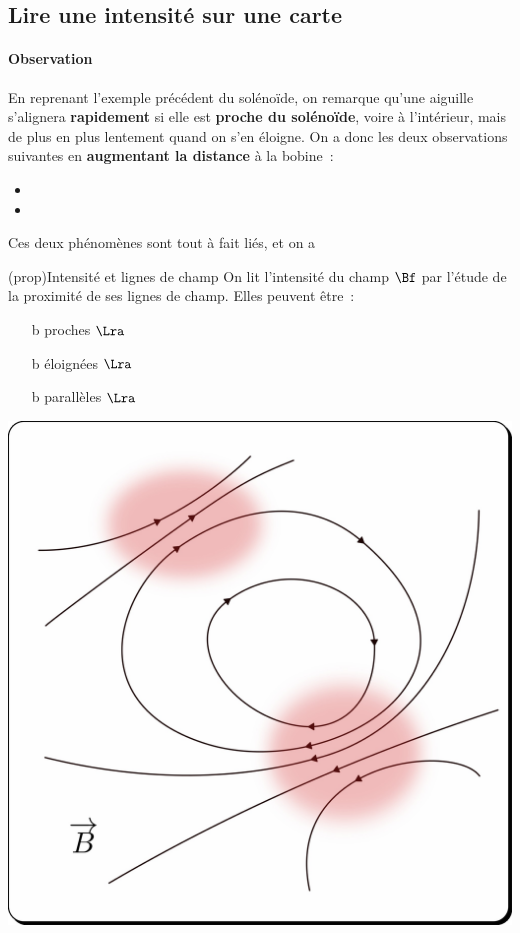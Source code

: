 \documentclass[../../main/main.tex]{subfiles}
\begin{document}
\subsection{Lire une intensité sur une carte}
\paragraph*{Observation}
En reprenant l'exemple précédent du solénoïde, on remarque qu'une aiguille
s'alignera \textbf{rapidement} si elle est \textbf{proche du solénoïde}, voire à
l'intérieur, mais de plus en plus lentement quand on s'en éloigne. On a donc les
deux observations suivantes en \textbf{augmentant la distance} à la bobine~:
\begin{itemize}
	\item {}
	\item {}
\end{itemize}
Ces deux phénomènes sont tout à fait liés, et on a
\begin{tcb*}[sidebyside, righthand ratio=.25](prop){Intensité et lignes de champ}
	On lit l'intensité du champ $\Bf$ par l'étude de la proximité de ses lignes
	de champ. Elles peuvent être~:
	\begin{itemize}
		\item[b]{proches} $\Lra$ 
		\item[b]{éloignées} $\Lra$ 
		\item[b]{parallèles} $\Lra$ 
	\end{itemize}
	\tcblower
	\begin{center}
		\includegraphics[width=\linewidth]{ldc_intens}
	\end{center}
\end{tcb*}
\end{document}
